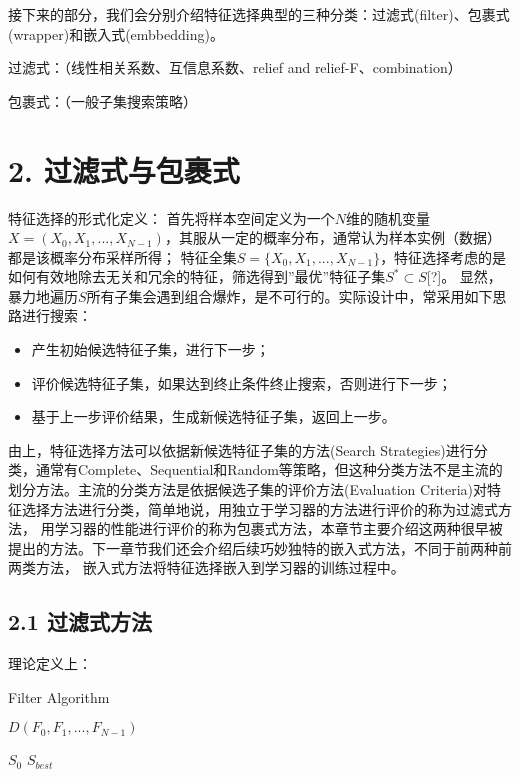 \documentclass[a4paper,UTF8]{article}
\begin{document}
  接下来的部分，我们会分别介绍特征选择典型的三种分类：过滤式(filter)、包裹式(wrapper)和嵌入式(embbedding)。

  过滤式：（线性相关系数、互信息系数、relief and relief-F、combination）

  包裹式：（一般子集搜索策略）





\section*{2. 过滤式与包裹式}
  特征选择的形式化定义：
  首先将样本空间定义为一个$ N $维的随机变量$ X = (X_{0}, X_{1}, ... , X_{N-1})$，其服从一定的概率分布，通常认为样本实例（数据）都是该概率分布采样所得；
  特征全集$ S = \{X_{0}, X_{1}, ... , X_{N-1}\} $，特征选择考虑的是如何有效地除去无关和冗余的特征，筛选得到”最优”特征子集$ S^{*} \subset S $[?]。
  显然，暴力地遍历$ S $所有子集会遇到组合爆炸，是不可行的。实际设计中，常采用如下思路进行搜索：

  \begin{itemize}

    \item 产生初始候选特征子集，进行下一步；
    \item 评价候选特征子集，如果达到终止条件终止搜索，否则进行下一步；
    \item 基于上一步评价结果，生成新候选特征子集，返回上一步。

  \end{itemize}
  由上，特征选择方法可以依据新候选特征子集的方法(Search Strategies)进行分类，通常有Complete、Sequential和Random等策略，但这种分类方法不是主流的
  划分方法。主流的分类方法是依据候选子集的评价方法(Evaluation Criteria)对特征选择方法进行分类，简单地说，用独立于学习器的方法进行评价的称为过滤式方法，
  用学习器的性能进行评价的称为包裹式方法，本章节主要介绍这两种很早被提出的方法。下一章节我们还会介绍后续巧妙独特的嵌入式方法，不同于前两种前两类方法，
  嵌入式方法将特征选择嵌入到学习器的训练过程中。


\subsection*{2.1 过滤式方法}
  理论定义上：

  \begin{algorithm}
    \caption{Filter Algorithm}
    \begin{algorithmic}
      \REQUIRE $ D(F_{0}, F_{1},..., F_{N-1})$

               $ S_{0}$
      \ENSURE $ S_{best} $

    \end{algorithmic}




  \end{algorithm}
\end{document}
